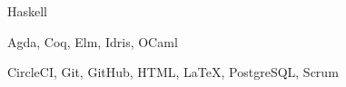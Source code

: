 
\cvitem
{}
{Haskell}

\cvitem
{}
{Agda, Coq, Elm, Idris, OCaml}

\cvitem
{}
{CircleCI, Git, GitHub, HTML, \LaTeX, PostgreSQL, Scrum}

